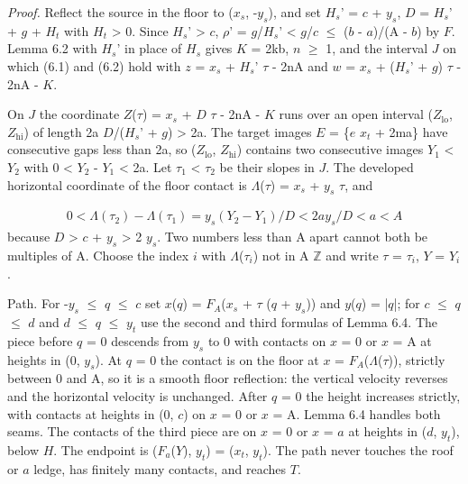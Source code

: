 \documentclass[11pt]{article}
\begin{document}
\emph{Proof.} Reflect the source in the floor to (\(x_{s}\), -\(y_{s}\)), and set \(H_{s}\)' = \(c\) + \(y_{s}\), \(D\) = \(H_{s}\)' + \(g\) + \(H_{t}\) with \(H_{t}\) > 0. Since \(H_{s}\)' > \(c\), \(\rho\)' = \(g\)/\(H_{s}\)' < \(g\)/\(c\) \(\le\) (\(b\) - \(a\))/(A - \(b\)) by \(F\). Lemma 6.2 with \(H_{s}\)' in place of \(H_{s}\) gives \(K\) = 2kb, \(n\) \(\ge\) 1, and the interval \(J\) on which (6.1) and (6.2) hold with \(z\) = \(x_{s}\) + \(H_{s}\)' \(\tau\) - 2nA and \(w\) = \(x_{s}\) + (\(H_{s}\)' + \(g\)) \(\tau\) - 2nA - \(K\).

On \(J\) the coordinate \(Z\)(\(\tau\)) = \(x_{s}\) + \(D\) \(\tau\) - 2nA - \(K\) runs over an open interval (\(Z_{\mathrm{lo}}\), \(Z_{\mathrm{hi}}\)) of length 2a \(D\)/(\(H_{s}\)' + \(g\)) > 2a. The target images \(E\) = \{\(e\) \(x_{t}\) + 2ma\} have consecutive gaps less than 2a, so (\(Z_{\mathrm{lo}}\), \(Z_{\mathrm{hi}}\)) contains two consecutive images \(Y_{1}\) < \(Y_{2}\) with 0 < \(Y_{2}\) - \(Y_{1}\) < 2a. Let \(\tau_{1}\) < \(\tau_{2}\) be their slopes in \(J\). The developed horizontal coordinate of the floor contact is \(\Lambda\)(\(\tau\)) = \(x_{s}\) + \(y_{s}\) \(\tau\), and

\begin{gather*}
0 < \Lambda(\tau_{2}) - \Lambda(\tau_{1}) = y_{s} (Y_{2} - Y_{1})/D < 2a y_{s}/D < a < A
\end{gather*}
because \(D\) > \(c\) + \(y_{s}\) > 2 \(y_{s}\). Two numbers less than A apart cannot both be multiples of A. Choose the index \(i\) with \(\Lambda\)(\(\tau_{i}\)) not in A \(\mathbb{Z}\) and write \(\tau\) = \(\tau_{i}\), \(Y\) = \(Y_{i}\).

Path. For -\(y_{s}\) \(\le\) \(q\) \(\le\) \(c\) set \(x\)(\(q\)) = \(F_{A}\)(\(x_{s}\) + \(\tau\) (\(q\) + \(y_{s}\))) and \(y\)(\(q\)) = |\(q\)|; for \(c\) \(\le\) \(q\) \(\le\) \(d\) and \(d\) \(\le\) \(q\) \(\le\) \(y_{t}\) use the second and third formulas of Lemma 6.4. The piece before \(q\) = 0 descends from \(y_{s}\) to 0 with contacts on \(x\) = 0 or \(x\) = A at heights in (0, \(y_{s}\)). At \(q\) = 0 the contact is on the floor at \(x\) = \(F_{A}\)(\(\Lambda\)(\(\tau\))), strictly between 0 and A, so it is a smooth floor reflection: the vertical velocity reverses and the horizontal velocity is unchanged. After \(q\) = 0 the height increases strictly, with contacts at heights in (0, \(c\)) on \(x\) = 0 or \(x\) = A. Lemma 6.4 handles both seams. The contacts of the third piece are on \(x\) = 0 or \(x\) = \(a\) at heights in (\(d\), \(y_{t}\)), below \(H\). The endpoint is (\(F_{a}\)(\(Y\)), \(y_{t}\)) = (\(x_{t}\), \(y_{t}\)). The path never touches the roof or \(a\) ledge, has finitely many contacts, and reaches \(T\).
\end{document}
